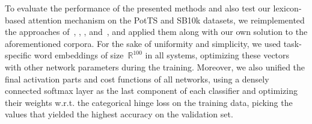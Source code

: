 To evaluate the performance of the presented methods and also test our
lexicon-based attention mechanism on the PotTS and SB10k datasets, we
reimplemented the approaches of~\citet{Yessenalina:11},
\citet{Socher:11,Socher:12,Socher:13}, \citet{Severyn:15},
and~\citet{Baziotis:17}, and applied them along with our own solution
to the aforementioned corpora.  For the sake of uniformity and
simplicity, we used task-specific word embeddings of
size~$\mathbb{R}^{100}$ in all systems, optimizing these vectors with
other network parameters during the training.  Moreover, we also
unified the final activation parts and cost functions of all networks,
using a densely connected softmax layer as the last component of each
classifier and optimizing their weights w.r.t. the categorical hinge
loss on the training data, picking the values that yielded the highest
accuracy on the validation set.

